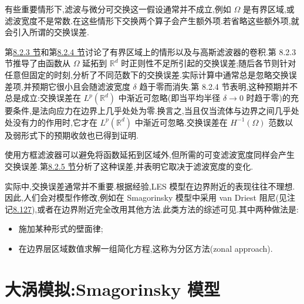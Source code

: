 \begin{note}[卷积与微分可交换性的结果总结]
\label{note:commutation-summary}
有些重要情形下,滤波与微分可交换这一假设通常并不成立,例如 $\Omega$ 是有界区域,或滤波宽度不是常数.在这些情形下交换两个算子会产生额外项.若省略这些额外项,就会引入所谓的交换误差.

第\hyperref[subsec:les-space-averaged-equations-bounded-domain]{8.2.3 节}和第\hyperref[subsec:gaussian-filter-commutation-error]{8.2.4 节}讨论了有界区域上的情形以及与高斯滤波器的卷积.第 8.2.3 节推导了由函数从 $\Omega$ 延拓到 $\mathbb{R}^d$ 时正则性不足所引起的交换误差;随后各节则针对任意但固定的时刻,分析了不同范数下的交换误差.实际计算中通常总是忽略交换误差项,并预期它很小且会随滤波宽度 $\delta$ 趋于零而消失.第 8.2.4 节表明,这种预期并不总是成立:交换误差在 $L^p(\mathbb{R}^d)$ 中渐近可忽略(即当平均半径 $\delta\to0$ 时趋于零)的充要条件,是法向应力在边界上几乎处处为零.换言之,当且仅当流体与边界之间几乎处处没有力的作用时,它才在 $L^p(\mathbb{R}^d)$ 中渐近可忽略.交换误差在 $H^{-1}(\Omega)$ 范数以及弱形式下的预期收敛也已得到证明.

使用方框滤波器可以避免将函数延拓到区域外,但所需的可变滤波宽度同样会产生交换误差.第\hyperref[subsec:box-filter-commutation-error]{8.2.5 节}分析了这种误差,并表明它取决于滤波宽度的变化.
\end{note}

\begin{note}[实际模拟]
\label{note:practical-commutation-simulations}
实际中,交换误差通常并不重要.根据经验,LES 模型在边界附近的表现往往不理想.因此,人们会对模型作修改,例如在 Smagorinsky 模型中采用 van Driest 阻尼(见注记\hyperref[note:van-driest-damping]{8.127}),或者在边界附近完全改用其他方法.此类方法的综述可见\parencite{PiomelliBalaras2002}.其中两种做法是:
\begin{itemize}
 \item 施加某种形式的壁面律;
 \item 在边界层区域数值求解一组简化方程,这称为分区方法(zonal approach).
\end{itemize}
\end{note}

\section{大涡模拟:Smagorinsky 模型}
\label{sec:les-models}
\label{sec:smagorinsky-model}

